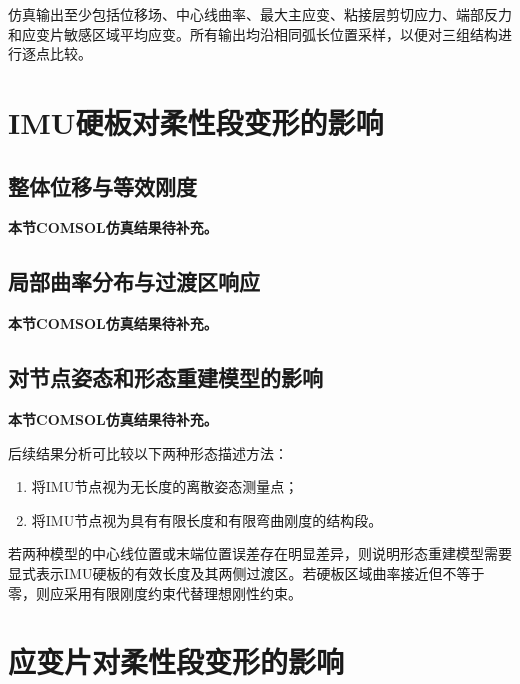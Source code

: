 仿真输出至少包括位移场、中心线曲率、最大主应变、粘接层剪切应力、端部反力和应变片敏感区域平均应变。所有输出均沿相同弧长位置采样，以便对三组结构进行逐点比较。


\section{IMU硬板对柔性段变形的影响}
\label{sec:imu_board_results}

\subsection{整体位移与等效刚度}

\textbf{本节COMSOL仿真结果待补充。}



\subsection{局部曲率分布与过渡区响应}

\textbf{本节COMSOL仿真结果待补充。}



\subsection{对节点姿态和形态重建模型的影响}

\textbf{本节COMSOL仿真结果待补充。}

后续结果分析可比较以下两种形态描述方法：

\begin{enumerate}
    \item 将IMU节点视为无长度的离散姿态测量点；
    \item 将IMU节点视为具有有限长度和有限弯曲刚度的结构段。
\end{enumerate}

若两种模型的中心线位置或末端位置误差存在明显差异，则说明形态重建模型需要显式表示IMU硬板的有效长度及其两侧过渡区。若硬板区域曲率接近但不等于零，则应采用有限刚度约束代替理想刚性约束。


\section{应变片对柔性段变形的影响}
\label{sec:strain_gauge_results}

